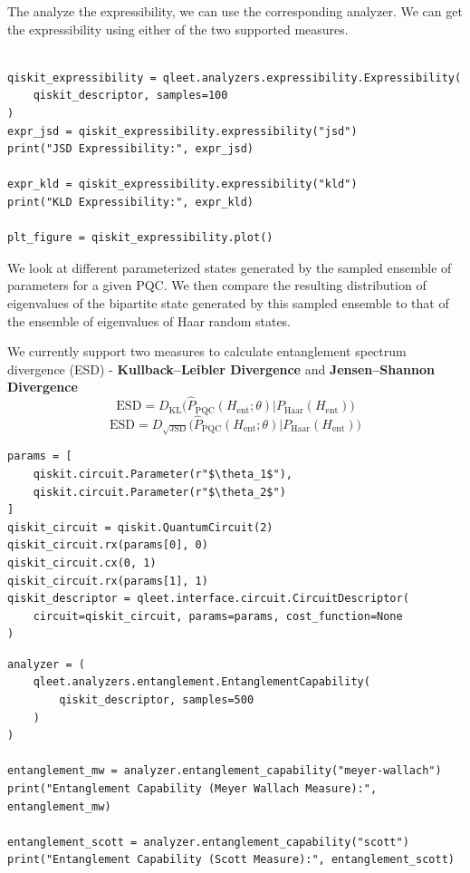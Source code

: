 \documentclass[%
 reprint,
 amsmath,
 amssymb,
 showkeys,
 pra,
 floatfix,
 onecolumn,
]{revtex4-2}
\begin{document}
The analyze the expressibility, we can use the corresponding analyzer. We can get the expressibility using either of the two supported measures.

\begin{lstlisting}

qiskit_expressibility = qleet.analyzers.expressibility.Expressibility(
    qiskit_descriptor, samples=100
)
expr_jsd = qiskit_expressibility.expressibility("jsd")
print("JSD Expressibility:", expr_jsd)

expr_kld = qiskit_expressibility.expressibility("kld")
print("KLD Expressibility:", expr_kld)

plt_figure = qiskit_expressibility.plot()
\end{lstlisting}

We look at different parameterized states generated by the sampled ensemble of parameters for a given PQC. We then compare the resulting distribution of eigenvalues of the bipartite state generated by this sampled ensemble to that of the ensemble of eigenvalues of Haar random states.

We currently support two measures to calculate entanglement spectrum divergence (ESD) - \textbf{Kullback–Leibler Divergence} and \textbf{Jensen–Shannon Divergence}
$$\textrm{ESD} = D_{\textrm{KL}} \Big(\hat{P}_{\textrm{PQC}}(H_{\textrm{ent}}; \theta) \big\vert P_{\textrm{Haar}}(H_{\textrm{ent}}) \Big) $$
$$\textrm{ESD} = D_{\sqrt{\textrm{JSD}}} \Big(\hat{P}_{\textrm{PQC}}(H_{\textrm{ent}}; \theta) \big\vert P_{\textrm{Haar}}(H_{\textrm{ent}}) \Big) $$

\begin{lstlisting}
params = [
    qiskit.circuit.Parameter(r"$\theta_1$"),
    qiskit.circuit.Parameter(r"$\theta_2$")
]
qiskit_circuit = qiskit.QuantumCircuit(2)
qiskit_circuit.rx(params[0], 0)
qiskit_circuit.cx(0, 1)
qiskit_circuit.rx(params[1], 1)
qiskit_descriptor = qleet.interface.circuit.CircuitDescriptor(
    circuit=qiskit_circuit, params=params, cost_function=None
)
\end{lstlisting}

\begin{lstlisting}
analyzer = (
    qleet.analyzers.entanglement.EntanglementCapability(
        qiskit_descriptor, samples=500
    )
)

entanglement_mw = analyzer.entanglement_capability("meyer-wallach")
print("Entanglement Capability (Meyer Wallach Measure):", entanglement_mw)

entanglement_scott = analyzer.entanglement_capability("scott")
print("Entanglement Capability (Scott Measure):", entanglement_scott)
\end{lstlisting}
\end{document}

